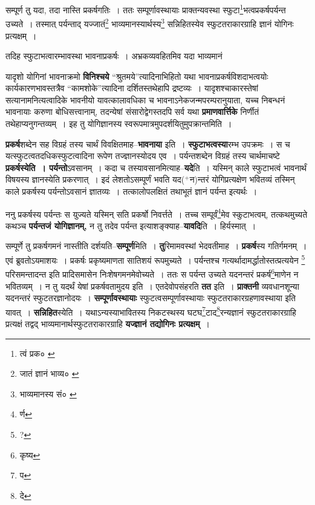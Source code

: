\documentclass[article,12pt,a4paper]{memoir}
\newcommand{\add}[1]{($^{+}$#1)}
\begin{document}
	  \pstart सम्पूर्ण तु यदा, तदा नास्ति प्रकर्षगतिः । ततः सम्पूर्णावस्थायाः प्राक्तन्यवस्था स्फुटा\footnote{त्वं प्रक० \cite{dp-edE}}\-भत्वप्रकर्षपर्यन्त उच्यते । तस्मात् पर्यन्ताद् यज्जातं\footnote{जातं ज्ञानं भाव्य० \cite{dp-msC} \cite{dp-msD}} भाव्यमानस्यार्थस्य\footnote{भाव्यमानस्य सं० \cite{dp-msA} \cite{dp-msB} \cite{dp-edP} \cite{dp-edH} \cite{dp-edE}} सन्निहितस्येव स्फुटतराकारग्राहि ज्ञानं योगिनः प्रत्यक्षम् ।
	\pend
       

	  \pstart तदिह स्फुटाभत्वारम्भावस्था भावनाप्रकर्षः । अभ्रकव्यवहितमिव यदा भाव्यमानं
	\pend
      
	  \endgroup
	

	  \pstart यादृशो योगिनां भावनाक्रमो \textbf{विनिश्चये} “श्रुतमये”त्यादिनाभिहितो यथा भावनाप्रकर्षविशदाभत्वयोः कार्यकारणभावस्तत्रैव “कामशोके”त्यादिना दर्शितस्तथेहापि द्रष्टव्यः । यादृशश्चाकारस्तेषां सत्यानामनित्यत्वादिके भावनीयो यावत्कालावधिका च भावनाऽनेकजन्मपरम्परानुयाता, यच्च निबन्धनं भावनायाः करुणा बोधिसत्त्वानाम्, तदन्येषां संसारोद्वेगस्तदपि सर्व यथा \textbf{प्रमाणवार्त्तिके} निर्णीतं तथेहाप्यनुगन्तव्यम् । इह तु योगिज्ञानस्य स्वरूपमात्रमुपदर्शयितुमुपक्रान्तमिति ।
	\pend
      

	  \pstart \textbf{प्रकर्ष}शब्देन सह विग्रहं तस्य चार्थं विवक्षितमाह--\textbf{भावनाया} इति । \textbf{स्फुटाभत्वस्या}रम्भ उपक्रमः । स च यत्स्फुटत्वतदधिकस्फुटत्वादिना रूपेण तज्ज्ञानस्योदय एव । पर्यन्तशब्देन विग्रहं तस्य चार्थमाचष्टे \textbf{प्रकर्षस्येति । पर्यन्तो}ऽवसानम् । कदा च तस्यावसानमित्याह--\textbf{यदे}ति । यस्मिन् काले स्फुटाभत्वं भावनार्थं विषयस्य ज्ञानस्येति प्रकरणात् । इदं लेशतोऽसम्पूर्णं भवति यद\add{न}न्तरं योगिप्रत्यक्षेण भवितव्यं तस्मिन् काले प्रकर्षस्य पर्यन्तोऽवसानं ज्ञातव्यः । तत्कालोपलक्षितं तथाभूतं ज्ञानं पर्यन्त इत्यर्थः ।
	\pend
      

	  \pstart ननु प्रकर्षस्य पर्यन्तः स युज्यते यस्मिन् सति प्रकर्षो निवर्त्तते । तच्च सम्पूर्वं\footnote{र्ण}\-मेव स्कुटाभत्वम्, तत्कथमुच्यते कथञ्च \textbf{पर्यन्तजं योगिज्ञानम्,} न तु तदेव पर्यन्त इत्याशङ्क्याह--\textbf{यावदि}ति । हिर्यस्मात् ।
	\pend
      

	  \pstart सम्पूर्णे तु प्रकर्षगमनं नास्तीति दर्शयति--\textbf{सम्पूर्ण}मिति । \textbf{तु}रिमामवस्थां भेदवतीमाह । \textbf{प्रकर्ष}स्य गतिर्गमनम् । एवं ब्रुवतोऽयमाशयः । प्रकर्षः प्रकृष्यमाणता सातिशयं रूपमुच्यते । पर्यन्तश्च गत्यर्थादामर्द्धातोस्तत्प्रत्ययेन \footnote{?} परिसमन्तादन्त इति प्रादिसमासेन निःशेषगमनमेवोच्यते । ततः स पर्यन्त उच्यते यदनन्तरं प्रकर्ष\footnote{कृष्य}\-माणेन न भवितव्यम् । न तु यदर्थं येषां प्रकर्षवतामुदय इति । एतदेवोपसंहरति \textbf{तत} इति । \textbf{प्राक्तनी} व्यवधानशून्या यदनन्तरं स्फुटतरज्ञानोदयः । \textbf{सम्पूर्णावस्थायाः} स्फुटत्वसम्पूर्णावस्थायाः स्फुटतराकारग्रहणावस्थाया इति यावत् । \textbf{सन्निहित}स्येति । यथाऽन्यस्याभावितस्य निकटस्थस्य घटघ\footnote{प}\-टाद\footnote{दे}\-रन्यज्ञानं स्फुटतराकारग्राहि प्रत्यक्षं तद्वद् भाव्यमानार्थस्फुटतराकारग्राहि \textbf{यज्ज्ञानं तद्योगिनः प्रत्यक्षम्} ।
	\pend
      
\end{document}
